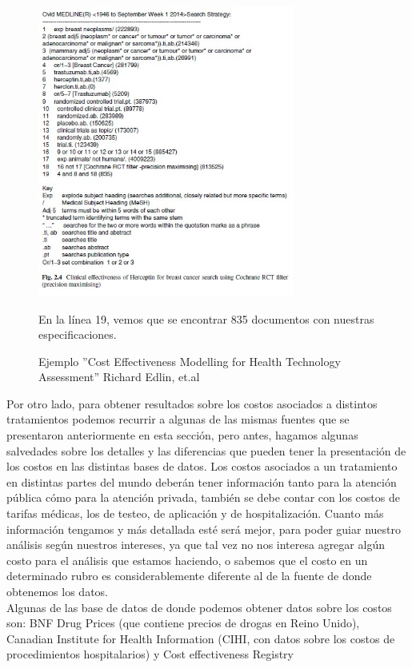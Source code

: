 \documentclass[12pt]{article}
\begin{document}
\begin{figure}[p]
    \centering
    \includegraphics[width=0.75\textwidth]{grafi/resultado_cancer_mama.jpg}
    \caption{Ejemplo ''Cost Effectiveness Modelling for Health Technology Assessment'' Richard Edlin, et.al}
    \label{fig:8}
  
    En la línea 19, vemos que se encontrar 835 documentos con nuestras especificaciones. 
\end{figure}

Por otro lado, para obtener resultados sobre los costos asociados a distintos tratamientos podemos recurrir a algunas de las mismas fuentes que se presentaron anteriormente en esta sección, pero antes, hagamos algunas salvedades sobre los detalles y las diferencias que pueden tener la presentación de los costos en las distintas bases de datos. Los costos asociados a un tratamiento en distintas partes del mundo deberán tener información tanto para la atención pública cómo para la atención privada, también se debe contar con los costos de tarifas médicas, los de testeo, de aplicación y de hospitalización. Cuanto más información tengamos y más detallada esté será mejor, para poder guiar nuestro análisis según nuestros intereses, ya que tal vez no nos interesa agregar algún costo para el análisis que estamos haciendo, o sabemos que el costo en un determinado rubro es considerablemente diferente al de la fuente de donde obtenemos los datos.\\

Algunas de las base de datos de donde podemos obtener datos sobre los costos son: BNF Drug Prices (que contiene precios de drogas en Reino Unido), Canadian Institute for Health Information (CIHI, con datos sobre los costos de procedimientos hospitalarios) y Cost effectiveness Registry
\end{document}
